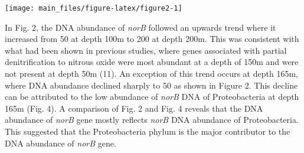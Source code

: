 \documentclass[11 pt,]{article}
\newenvironment{Shaded}{\begin{snugshade}}{\end{snugshade}}
\newcommand{\KeywordTok}[1]{\textcolor[rgb]{0.13,0.29,0.53}{\textbf{#1}}}
\newcommand{\DataTypeTok}[1]{\textcolor[rgb]{0.13,0.29,0.53}{#1}}
\newcommand{\DecValTok}[1]{\textcolor[rgb]{0.00,0.00,0.81}{#1}}
\newcommand{\StringTok}[1]{\textcolor[rgb]{0.31,0.60,0.02}{#1}}
\newcommand{\CommentTok}[1]{\textcolor[rgb]{0.56,0.35,0.01}{\textit{#1}}}
\newcommand{\OtherTok}[1]{\textcolor[rgb]{0.56,0.35,0.01}{#1}}
\newcommand{\OperatorTok}[1]{\textcolor[rgb]{0.81,0.36,0.00}{\textbf{#1}}}
\newcommand{\NormalTok}[1]{#1}
\begin{document}
\begin{Shaded}
\end{Shaded}

\begin{center}\texttt{[image: main\_files/figure-latex/figure2-1]} \end{center}

In Fig. 2, the DNA abundance of \emph{norB} followed an upwards trend
where it increased from 50 at depth 100m to 200 at depth 200m. This was
consistent with what had been shown in previous studies, where genes
associated with partial denitrification to nitrous oxide were most
abundant at a depth of 150m and were not present at depth 50m (11). An
exception of this trend occurs at depth 165m, where DNA abundance
declined sharply to 50 as shown in Figure 2. This decline can be
attributed to the low abundance of \emph{norB} DNA of Proteobacteria at
depth 165m (Fig. 4). A comparison of Fig. 2 and Fig. 4 reveals that the
DNA abundance of \emph{norB} gene mostly reflects \emph{norB} DNA
abundance of Proteobacteria. This suggested that the Proteobacteria
phylum is the major contributor to the DNA abundance of \emph{norB}
gene.
\end{document}
